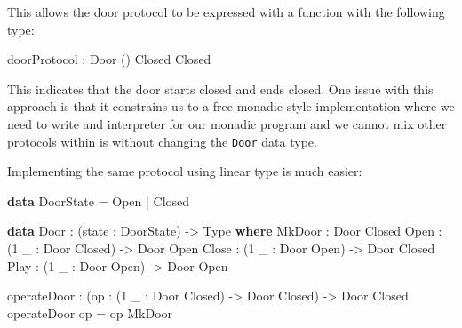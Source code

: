 \documentclass[
]{article}
\newenvironment{Shaded}{}{}
\newcommand{\DataTypeTok}[1]{\textcolor[rgb]{0.56,0.13,0.00}{#1}}
\newcommand{\DecValTok}[1]{\textcolor[rgb]{0.25,0.63,0.44}{#1}}
\newcommand{\KeywordTok}[1]{\textcolor[rgb]{0.00,0.44,0.13}{\textbf{#1}}}
\newcommand{\NormalTok}[1]{#1}
\newcommand{\OperatorTok}[1]{\textcolor[rgb]{0.40,0.40,0.40}{#1}}
\newcommand{\OtherTok}[1]{\textcolor[rgb]{0.00,0.44,0.13}{#1}}
\begin{document}
This allows the door protocol to be expressed with a function with the
following type:

\begin{Shaded}
\begin{Highlighting}[]
\NormalTok{doorProtocol }\OperatorTok{:} \DataTypeTok{Door}\NormalTok{ () }\DataTypeTok{Closed} \DataTypeTok{Closed}
\end{Highlighting}
\end{Shaded}

This indicates that the door starts closed and ends closed. One issue
with this approach is that it constrains us to a free-monadic style
implementation where we need to write and interpreter for our monadic
program and we cannot mix other protocols within is without changing the
\texttt{Door} data type.

Implementing the same protocol using linear type is much easier:

\begin{Shaded}
\begin{Highlighting}[]

\KeywordTok{data} \DataTypeTok{DoorState} \OtherTok{=} \DataTypeTok{Open} \OperatorTok{|} \DataTypeTok{Closed}

\KeywordTok{data} \DataTypeTok{Door} \OperatorTok{:}\NormalTok{ (state }\OperatorTok{:} \DataTypeTok{DoorState}\NormalTok{) }\OtherTok{{-}\textgreater{}} \DataTypeTok{Type} \KeywordTok{where}
  \DataTypeTok{MkDoor} \OperatorTok{:} \DataTypeTok{Door} \DataTypeTok{Closed}
  \DataTypeTok{Open} \OperatorTok{:}\NormalTok{ (}\DecValTok{1}\NormalTok{ \_ }\OperatorTok{:} \DataTypeTok{Door} \DataTypeTok{Closed}\NormalTok{) }\OtherTok{{-}\textgreater{}} \DataTypeTok{Door} \DataTypeTok{Open}
  \DataTypeTok{Close} \OperatorTok{:}\NormalTok{ (}\DecValTok{1}\NormalTok{ \_ }\OperatorTok{:} \DataTypeTok{Door} \DataTypeTok{Open}\NormalTok{) }\OtherTok{{-}\textgreater{}} \DataTypeTok{Door} \DataTypeTok{Closed}
  \DataTypeTok{Play} \OperatorTok{:}\NormalTok{ (}\DecValTok{1}\NormalTok{ \_ }\OperatorTok{:} \DataTypeTok{Door} \DataTypeTok{Open}\NormalTok{) }\OtherTok{{-}\textgreater{}} \DataTypeTok{Door} \DataTypeTok{Open}

\NormalTok{operateDoor }\OperatorTok{:}\NormalTok{ (op }\OperatorTok{:}\NormalTok{ (}\DecValTok{1}\NormalTok{ \_ }\OperatorTok{:} \DataTypeTok{Door} \DataTypeTok{Closed}\NormalTok{) }\OtherTok{{-}\textgreater{}} \DataTypeTok{Door} \DataTypeTok{Closed}\NormalTok{)}
           \OtherTok{{-}\textgreater{}} \DataTypeTok{Door} \DataTypeTok{Closed}
\NormalTok{operateDoor op }\OtherTok{=}\NormalTok{ op }\DataTypeTok{MkDoor}
\end{Highlighting}
\end{Shaded}
\end{document}
